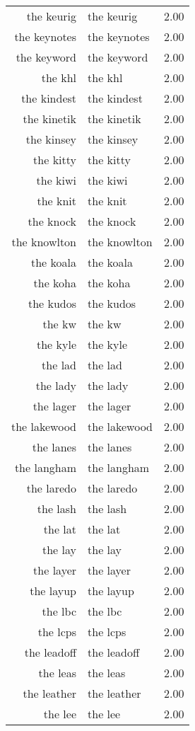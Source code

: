 \begin{table}[ht]
\begin{tabular}{rlr}
  the keurig & the keurig & 2.00 \\ 
  the keynotes & the keynotes & 2.00 \\ 
  the keyword & the keyword & 2.00 \\ 
  the khl & the khl & 2.00 \\ 
  the kindest & the kindest & 2.00 \\ 
  the kinetik & the kinetik & 2.00 \\ 
  the kinsey & the kinsey & 2.00 \\ 
  the kitty & the kitty & 2.00 \\ 
  the kiwi & the kiwi & 2.00 \\ 
  the knit & the knit & 2.00 \\ 
  the knock & the knock & 2.00 \\ 
  the knowlton & the knowlton & 2.00 \\ 
  the koala & the koala & 2.00 \\ 
  the koha & the koha & 2.00 \\ 
  the kudos & the kudos & 2.00 \\ 
  the kw & the kw & 2.00 \\ 
  the kyle & the kyle & 2.00 \\ 
  the lad & the lad & 2.00 \\ 
  the lady & the lady & 2.00 \\ 
  the lager & the lager & 2.00 \\ 
  the lakewood & the lakewood & 2.00 \\ 
  the lanes & the lanes & 2.00 \\ 
  the langham & the langham & 2.00 \\ 
  the laredo & the laredo & 2.00 \\ 
  the lash & the lash & 2.00 \\ 
  the lat & the lat & 2.00 \\ 
  the lay & the lay & 2.00 \\ 
  the layer & the layer & 2.00 \\ 
  the layup & the layup & 2.00 \\ 
  the lbc & the lbc & 2.00 \\ 
  the lcps & the lcps & 2.00 \\ 
  the leadoff & the leadoff & 2.00 \\ 
  the leas & the leas & 2.00 \\ 
  the leather & the leather & 2.00 \\ 
  the lee & the lee & 2.00 \\ 

\end{tabular}
\end{table}
